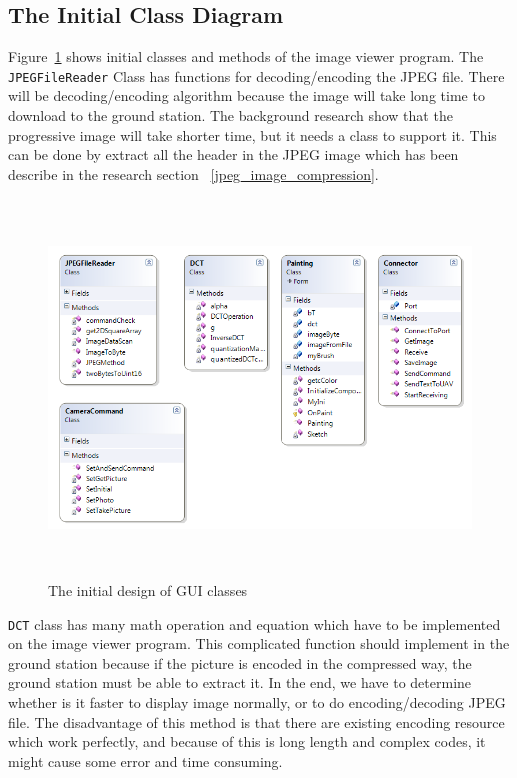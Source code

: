 \subsection*{The Initial Class Diagram}
Figure~\ref{ini_Class} shows initial classes and methods of the image viewer program.
The \texttt{JPEGFileReader} Class has functions for decoding/encoding the JPEG file.
There will be decoding/encoding algorithm because the image will take long time to download to the ground station. 
The background research show that the progressive image will take shorter time, but it needs a class to support it. This can be done by extract all the header in the JPEG image which has been describe in the research section ~\ref{jpeg_image_compression}. 
\begin{center}
\begin{figure}[!hbtp]
\includegraphics[width=150mm,height=100mm]{figures/initialClassDiagram.png} 
\caption{The initial design of GUI classes\label{ini_Class}}
\end{figure}
\end{center}
\texttt{DCT} class has many math operation and equation which have to be implemented on the image viewer program. 
This complicated function should implement in the ground station because if the picture is encoded in the compressed way, the ground station must be able to extract it. In the end, we have to determine whether is it faster to display image normally, or to do encoding/decoding JPEG file. 
The disadvantage of this method is that there are existing encoding resource which work perfectly, and because of this is long length and complex codes, it might cause some error and time consuming.

